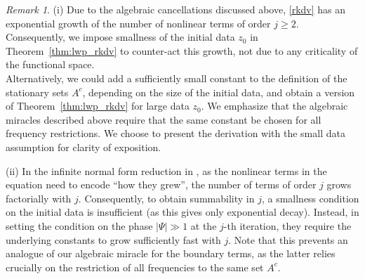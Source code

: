 \documentclass[a4paper,
11pt,  reqno]{amsart}
\newcommand{\5}{\textup{V}}
\newcommand{\noi}{\noindent}
\theoremstyle{remark}
\newtheorem{remark}[theorem]{Remark}
\numberwithin{equation}{section}
\numberwithin{theorem}{section}
\begin{document}
\begin{remark}
\rm 

(i) Due to the  algebraic cancellations discussed above, \eqref{rkdv} has an exponential growth of the number of nonlinear terms of order $j\ge 2$. Consequently, we impose smallness of the initial data $z_0$ in Theorem~\ref{thm:lwp_rkdv} to counter-act this growth, not due to any criticality of the functional space.
\\
Alternatively, we could add a sufficiently small constant to the definition of the stationary sets $A^c$, depending on the size of the initial data, and obtain a version of Theorem~\ref{thm:lwp_rkdv} for large data $z_0$. We emphasize that the algebraic miracles described above require that the same constant be chosen for all frequency restrictions.
We choose to present the derivation with the small data assumption for clarity of exposition. 


\smallskip 
\noi
(ii) In the infinite normal form reduction in \cite{GuoKwonOh_nls, kishimoto}, as the nonlinear terms in the equation need to encode ``how they grew'', the number of terms of order $j$ grows factorially with $j$. Consequently, to obtain summability in $j$, a smallness condition on the initial data is insufficient (as this gives only exponential decay). Instead, in setting the condition on the phase $|\Psi| \gg 1$ at the $j$-th iteration, they require the underlying constants to grow sufficiently fast with $j$. 
Note that this prevents an analogue of our algebraic miracle for the boundary terms, as the latter relies crucially on the restriction of all frequencies to the same set $A^c$. 






\end{remark}
    
\end{document}
